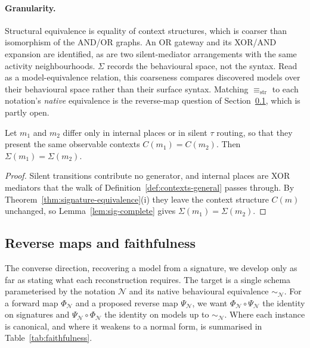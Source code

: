 \paragraph{Granularity.}
Structural equivalence is equality of context structures, which is coarser than isomorphism of the
AND/OR graphs. An OR gateway and its XOR/AND expansion are identified, as are two silent-mediator arrangements
with the same activity neighbourhoods. $\Sigma$ records the behavioural space, not the
syntax. Read as a model-equivalence relation, this coarseness compares discovered models over
their behavioural space rather than their surface syntax. Matching
$\equiv_{\mathrm{str}}$ to each notation's \emph{native}
equivalence is the reverse-map question of Section~\ref{subsec:reverse-map}, which is partly open.

\begin{corollary}\label{cor:internal-routing-quotient}
Let $m_1$ and $m_2$ differ only in internal places or in silent $\tau$ routing, so that they present the same observable contexts $C(m_1)=C(m_2)$. Then $\Sigma(m_1)=\Sigma(m_2)$.
\end{corollary}

\begin{proof}
Silent transitions contribute no generator, and internal places are XOR mediators that the walk of Definition~\ref{def:contexts-general} passes through. By Theorem~\ref{thm:signature-equivalence}(i) they leave the context structure $C(m)$ unchanged, so Lemma~\ref{lem:sig-complete} gives $\Sigma(m_1)=\Sigma(m_2)$.
\end{proof}

\subsection{Reverse maps and faithfulness}\label{subsec:reverse-map}

The converse direction, recovering a model from a signature, we develop only as far as stating what
each reconstruction requires. The target is a single schema parameterised by the notation
$\mathcal{N}$ and its native behavioural equivalence $\sim_{\mathcal{N}}$. For a forward map
$\Phi_{\mathcal{N}}$ and a proposed reverse map $\Psi_{\mathcal{N}}$, we want $\Phi_{\mathcal{N}}
\circ \Psi_{\mathcal{N}}$ the identity on signatures and $\Psi_{\mathcal{N}} \circ
\Phi_{\mathcal{N}}$ the identity on models up to $\sim_{\mathcal{N}}$. Where each instance is
canonical, and where it weakens to a normal form, is summarised in Table~\ref{tab:faithfulness}.

